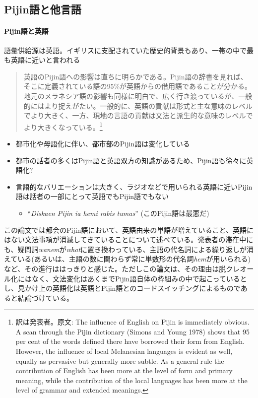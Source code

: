 \documentclass[11pt,a4paper]{jsarticle}
\begin{document}
\subsection{Pijin語と他言語}
\paragraph{Pijin語と英語} 語彙供給源は英語。イギリスに支配されていた歴史的背景もあり、一帯の中で最も英語に近いと言われる

\begin{quotation}
  英語のPijin語への影響は直ちに明らかである。Pijin語の辞書\citep{yumi}を見れば、そこに定義されている語の95\%が英語からの借用語であることが分かる。地元のメラネシア語の影響も同様に明白で、広く行き渡っているが、一般的にはより捉えがたい。一般的に、英語の貢献は形式と主な意味のレベルでより大きく、一方、現地の言語の貢献は文法と派生的な意味のレベルでより大きくなっている。\citep{malaitan}\footnote{訳は発表者。原文: The influence of English on Pijin is immediately obvious. A scan through the Pijin dictionary (Simons and Young 1978) shows that 95 per cent of the words defined there have borrowed their form from English. However, the influence of local Melanesian languages is evident as well, equally as pervasive but generally more subtle. As a general rule the contribution of English has been more at the level of form and primary meaning, while the contribution of the local languages has been more at the level of grammar and extended meanings.}
\end{quotation}
\cite{nativization}
\begin{itemize}
  \item 都市化や母語化に伴い、都市部のPijin語は変化している
  \item 都市の話者の多くはPijin語と英語双方の知識があるため、Pijin語も徐々に英語化?
  \item 言語的なバリエーションは大きく、ラジオなどで用いられる英語に近いPijin語は話者の一部にとって英語でもPijin語でもない
  \begin{itemize}
    \item ``\textit{Diskaen Pijin ia hemi rabis tumas}'' (このPijin語は最悪だ)
  \end{itemize}
\end{itemize}

この論文では都会のPijin語において、英語由来の単語が増えていること、英語にはない文法事項が消滅してきていることについて述べている。発表者の滞在中にも、疑問詞\textit{wanem}が\textit{what}に置き換わっている、主語の代名詞による繰り返しが消えている(あるいは、主語の数に関わらず常に単数形の代名詞\textit{hem}が用いられる)など、その進行ははっきりと感じた。ただしこの論文は、その理由は脱クレオール化にはなく、文法変化はあくまでPijin語自体の枠組みの中で起こっているとし、見かけ上の英語化は英語とPijin語とのコードスイッチングによるものであると結論づけている。
\end{document}
